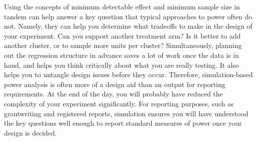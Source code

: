 Using the concepts of minimum detectable effect
and minimum sample size in tandem can help answer a key question
that typical approaches to power often do not.
Namely, they can help you determine what tradeoffs to make
in the design of your experiment.
Can you support another treatment arm?
Is it better to add another cluster,
or to sample more units per cluster?
Simultaneously, planning out the regression structure
in advance saves a lot of work once the data is in hand,
and helps you think critically about what you are really testing.
It also helps you to untangle design issues before they occur.
Therefore, simulation-based power analysis is often more of a design aid
than an output for reporting requirements.
At the end of the day, you will probably have reduced
the complexity of your experiment significantly.
For reporting purposes, such as grantwriting and registered reports,
simulation ensures you will have understood the key questions well enough
to report standard measures of power once your design is decided.


